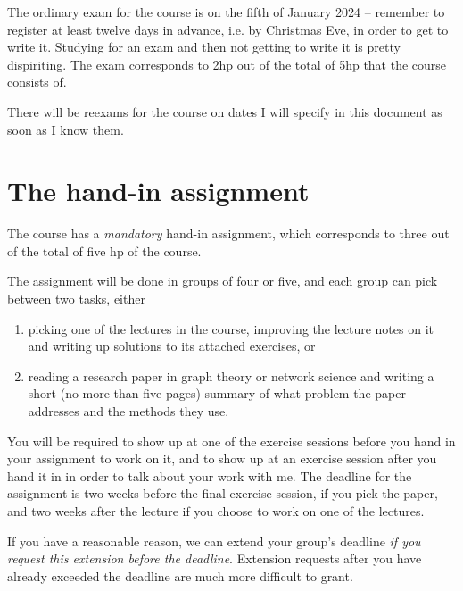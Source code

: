 \documentclass{tufte-handout}
\begin{document}
The ordinary exam for the course is on the fifth of January 2024 -- remember to register at least twelve days in advance, i.e. by Christmas Eve, in order to get to write it. Studying for an exam and then not getting to write it is pretty dispiriting. The exam corresponds to 2hp out of the total of 5hp that the course consists of.

There will be reexams for the course on dates I will specify in this document as soon as I know them.

\section{The hand-in assignment}

The course has a \emph{mandatory} hand-in assignment, which corresponds to three out of the total of five hp of the course.

The assignment will be done in groups of four or five, and each group can pick between two tasks, either
\begin{enumerate}
  \item picking one of the lectures in the course, improving the lecture notes on it and writing up solutions to its attached exercises, or
  \item reading a research paper in graph theory or network science and writing a short (no more than five pages) summary of what problem the paper addresses and the methods they use.
\end{enumerate}

You will be required to show up at one of the exercise sessions before you hand in your assignment to work on it, and to show up at an exercise session after you hand it in in order to talk about your work with me. The deadline for the assignment is two weeks before the final exercise session, if you pick the paper, and two weeks after the lecture if you choose to work on one of the lectures.

If you have a reasonable reason, we can extend your group's deadline \emph{if you request this extension before the deadline}. Extension requests after you have already exceeded the deadline are much more difficult to grant.



\end{document}
